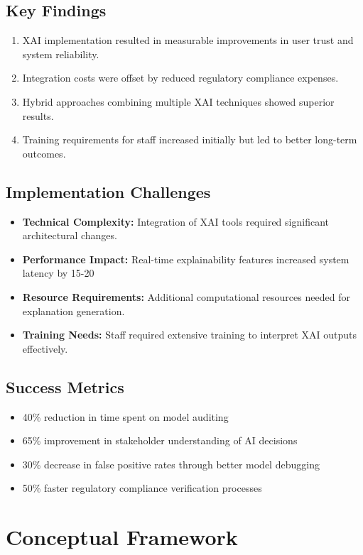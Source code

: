 \documentclass[12pt]{article}
\begin{document}
\subsection{Key Findings}
\begin{enumerate}[noitemsep]
  \item XAI implementation resulted in measurable improvements in user trust and system reliability.
  \item Integration costs were offset by reduced regulatory compliance expenses.
  \item Hybrid approaches combining multiple XAI techniques showed superior results.
  \item Training requirements for staff increased initially but led to better long-term outcomes.
\end{enumerate}

\subsection{Implementation Challenges}
\begin{itemize}[noitemsep]
  \item \textbf{Technical Complexity:} Integration of XAI tools required significant architectural changes.
  \item \textbf{Performance Impact:} Real-time explainability features increased system latency by 15-20%
  \item \textbf{Resource Requirements:} Additional computational resources needed for explanation generation.
  \item \textbf{Training Needs:} Staff required extensive training to interpret XAI outputs effectively.
\end{itemize}

\subsection{Success Metrics}
\begin{itemize}[noitemsep]
  \item 40\% reduction in time spent on model auditing
  \item 65\% improvement in stakeholder understanding of AI decisions
  \item 30\% decrease in false positive rates through better model debugging
  \item 50\% faster regulatory compliance verification processes
\end{itemize}
\section{Conceptual Framework}
\end{document}
